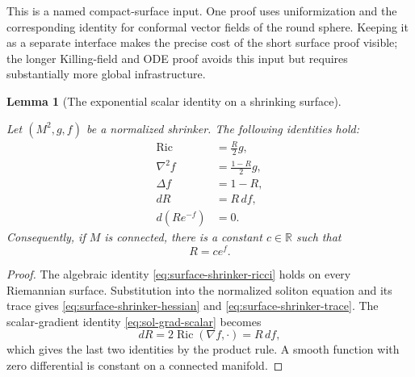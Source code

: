 \documentclass[10pt]{coll-l}
\newcommand{\R}{\mathbb{R}}
\newtheorem{lemma}[theorem]{Lemma}
\theoremstyle{definition}
\theoremstyle{remark}
\numberwithin{section}{chapter}
\numberwithin{equation}{chapter}
\newcommand{\Ric}{\operatorname{Ric}}
\begin{document}
This is a named compact-surface input.  One proof uses uniformization and
the corresponding identity for conformal vector fields of the round
sphere.  Keeping it as a separate interface makes the precise cost of the
short surface proof visible; the longer Killing-field and ODE proof avoids
this input but requires substantially more global infrastructure.

\begin{lemma}[The exponential scalar identity on a shrinking surface]
\label{lem:surface-shrinker-exponential-scalar}
\leavevmode\par\noindent
Let $(M^2,g,f)$ be a normalized shrinker.  The following identities hold:
\begin{align}
 \Ric&=\frac R2g,                                        \label{eq:surface-shrinker-ricci}\\
 \nabla^2f&=\frac{1-R}{2}g,                              \label{eq:surface-shrinker-hessian}\\
 \Delta f&=1-R,                                          \label{eq:surface-shrinker-trace}\\
 dR&=R\,df,                                               \label{eq:surface-shrinker-grad-scalar}\\
 d(Re^{-f})&=0.                                           \label{eq:surface-shrinker-exponential-closed}
\end{align}
Consequently, if $M$ is connected, there is a constant $c\in\R$ such that
\begin{equation}
                             R=ce^f.                     \label{eq:surface-shrinker-exponential-scalar}
\end{equation}
\end{lemma}

\begin{proof}
The algebraic identity \eqref{eq:surface-shrinker-ricci} holds on every
Riemannian surface.  Substitution into the normalized soliton equation and
its trace gives \eqref{eq:surface-shrinker-hessian} and
\eqref{eq:surface-shrinker-trace}.  The scalar-gradient identity
\eqref{eq:sol-grad-scalar} becomes
\[
                dR=2\Ric(\nabla f,\mathord\cdot)=R\,df,
\]
which gives the last two identities by the product rule.  A smooth function
with zero differential is constant on a connected manifold.
\end{proof}
\end{document}

